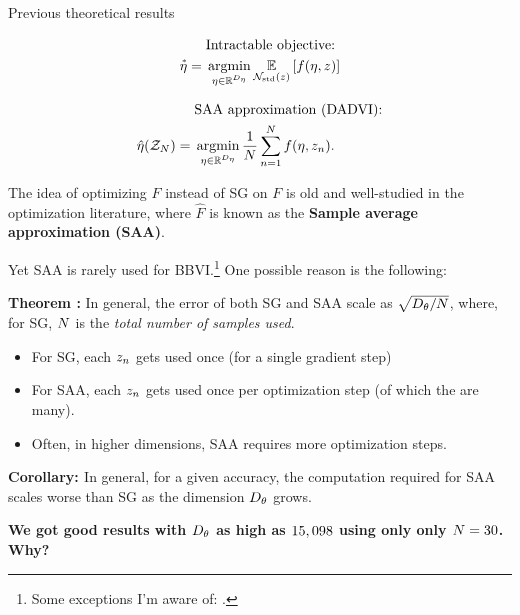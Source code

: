 \documentclass[8pt]{beamer}\usepackage[]{graphicx}\usepackage[]{color}
\begin{document}
\begin{frame}[t]{Previous theoretical results}
\vspace{-3em}
\begin{minipage}[t]{0.48\textwidth}
    \begin{align*}
        &\text{Intractable objective:} 
        \\ \etastar %
            ={}& 
            \argmin_{\eta \in \etadom} \expect{\normz}{f(\eta, \z)}
    \end{align*}    
\end{minipage}
\begin{minipage}[t]{0.48\textwidth}
    \begin{align*}
        &\text{SAA approximation (DADVI):} 
        \\ \etahat(\Z) %
            ={}&  \argmin_{\eta \in \etadom} \meann f(\eta, \z_n).
    \end{align*}
\end{minipage}

\hrulefill

The idea of optimizing $\hat{F}$ instead of SG on $F$ is old and
well-studied in the optimization literature, where $\hat{F}$
is known as the \textbf{Sample average approximation (SAA)}.

Yet SAA is rarely used for BBVI.\footnote{Some exceptions I'm aware of:
\citet{giordano:2018:covariances,giordano:2022:bnp,wycoff:2022:sparsebayesianlasso,burroni:2023:saabbvi}.}
One possible reason is the following:


\noindent
\textbf{Theorem \citep{nemirovski:2009:sgdvsfixed}:}
In general, the error of both SG and SAA scale as
$\sqrt{{D_{\theta}} / N}$,
where, for SG, $N$ is the \textit{total number of samples used}.

%
\begin{itemize}
\item For SG, each $z_n$ gets used once (for a single gradient step)
\item For SAA, each $z_n$ gets used once per optimization step
(of which the are many).
\item Often, in higher dimensions, SAA requires more optimization steps.
\end{itemize}
%


\noindent
\textbf{Corollary: \citep{kim:2015:guidetosaa}}
In general, for a given accuracy, the computation required for SAA 
scales worse than SG as the dimension ${D_{\theta}}$ grows.

\textbf{
We got good results with ${D_{\theta}}$ as
high as $15,098$ using only
only $N = 30$.  Why?}


\end{frame}
\end{document}
